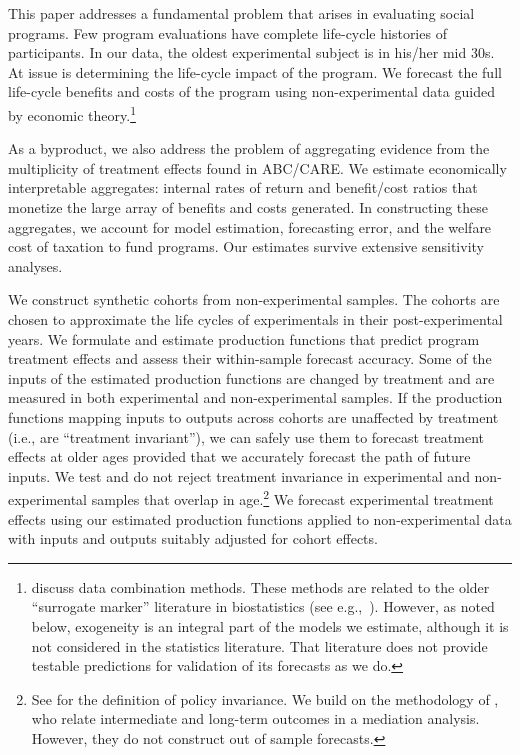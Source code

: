 This paper addresses a fundamental problem that arises in evaluating social programs. Few program evaluations have complete life-cycle histories of participants. In our data, the oldest experimental subject is in his/her mid 30s. At issue is determining the life-cycle impact of the program. We forecast the full life-cycle benefits and costs of the program using non-experimental data guided by economic theory.\footnote{\citet{Ridder_Moffitt_2007_hbk_metricsdata} discuss data combination methods. These methods are related to the older ``surrogate marker'' literature in biostatistics (see e.g.,\ \citealp{Prentice_1989_Surrogate_SiM}). However, as noted below, exogeneity is an integral part of the models we estimate, although it is not considered in the statistics literature. That literature does not provide testable predictions for validation of its forecasts as we do.}

As a byproduct, we also address the problem of aggregating evidence from the multiplicity of treatment effects found in ABC/CARE. We estimate economically interpretable aggregates: internal rates of return and benefit/cost ratios that monetize the large array of benefits and costs generated. In constructing these aggregates, we account for model estimation, forecasting error, and the welfare cost of taxation to fund programs. Our estimates survive extensive sensitivity analyses.

We construct synthetic cohorts from non-experimental samples. The cohorts are chosen to approximate the life cycles of experimentals in their post-experimental years. We formulate and estimate production functions that predict program treatment effects and assess their within-sample forecast accuracy. Some of the inputs of the estimated production functions are changed by treatment and are measured in both experimental and non-experimental samples. If the production functions mapping inputs to outputs across cohorts are unaffected by treatment (i.e., are ``treatment invariant''), we can safely use them to forecast treatment effects at older ages provided that we accurately forecast the path of future inputs. We test and do not reject treatment invariance in experimental and non-experimental samples that overlap in age.\footnote{See \cite{Hurwicz_1962_structural} for the definition of policy invariance. We build on the methodology of \citet{Heckman_Pinto_etal_2013_PerryFactor}, who relate intermediate and long-term outcomes in a mediation analysis. However, they do not construct out of sample forecasts.} We forecast experimental treatment effects using our estimated production functions applied to non-experimental data with inputs and outputs suitably adjusted for cohort effects.

